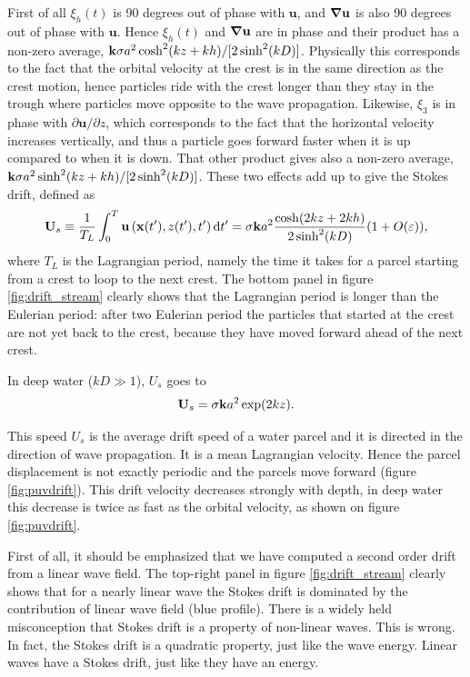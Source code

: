     First of all $\xi_h(t)$ is 90 degrees out of phase with $\mathbf{u}$, and 
    $\mbox{\boldmath $\nabla$} \mathbf{u}$ is also 90 degrees out of phase with   $\mathbf{u}$. 
    Hence   $\xi_h(t)$  and $\mbox{\boldmath $\nabla$} \mathbf{u}$  are in phase and their product has 
a non-zero average, $\mathbf{k} \sigma a^2 \cosh^2(kz+kh)/[2 \sinh^2(kD)]$. Physically this corresponds to the fact that the orbital velocity at the crest 
is in the same direction as the crest motion, hence particles ride with the crest longer than they stay in the trough where particles move opposite to the 
wave propagation.
  Likewise, $\xi_3$  is in phase with ${\partial \mathbf{u}}/{\partial z}$, which corresponds to the fact that the horizontal velocity increases vertically, 
and thus a particle goes forward faster when it is up compared to when it is down. 
That other product gives also a non-zero average, $\mathbf{k} \sigma a^2 \sinh^2(kz+kh)/[2 \sinh^2(kD)]$. These two effects add up to give  the Stokes drift, defined as
\begin{equation}
    {\mathbf U}_s\equiv \frac{1}{T_L}\int_0^T \mathbf{u}\left({\mathbf x}(t^\prime),z(t^\prime),t^\prime\right) \mathrm d t^\prime 
= \sigma \mathbf{k} a^2 \frac{\cosh(2kz+2kh)}{2\sinh^2(kD)} (1+O(\varepsilon)),
\end{equation}
where $T_L$ is the Lagrangian period, namely the time it takes for a parcel starting from a crest to loop to the next crest.
The bottom panel in figure  \ref{fig:drift_stream} clearly shows that the Lagrangian period is longer than the Eulerian period: after two Eulerian period 
the particles that started at the crest are not yet back to the crest, because they have moved forward ahead of the next crest. 

In deep water ($kD \gg 1$), $U_s$ goes to
\begin{equation}
    {\mathbf U}_s=\sigma \mathbf{k} a^2 \exp(2kz).\label{eq:Us_mono_deep}
\end{equation} 

This speed $U_s$ is the average drift speed of a water parcel and it is directed in the direction of wave propagation. It 
is a mean Lagrangian velocity. Hence the parcel displacement is not exactly periodic and the parcels move forward (figure \ref{fig:puvdrift}). This 
drift velocity decreases strongly with depth, in deep water this decrease is twice as fast as the orbital velocity, as shown on figure  \ref{fig:puvdrift}.

First of all, it should be emphasized that we have computed a second order drift from a linear wave field. 
The top-right  panel in figure \ref{fig:drift_stream} clearly shows that for a nearly linear wave the Stokes drift is dominated by the 
contribution of linear wave field (blue profile). There is a widely held misconception that Stokes drift is a property of non-linear waves. 
This is wrong.  In fact, the Stokes drift is a quadratic property, just like the wave energy. Linear waves have a Stokes drift, just like 
they have an energy. 


